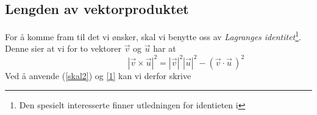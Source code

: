 \subsection*{Lengden av vektorproduktet \label{lengdvekforkl}}
For å komme fram til det vi ønsker, skal vi benytte oss av \textit{Lagranges identitet}\footnote{Den spesielt interesserte finner utledningen for identieten i }. Denne sier at vi for to vektorer
$ \vec{v} $ og $ \vec{u} $ har at
\[\phantom{testingcloservl} |\vec{v}\times\vec{u}|^2=|\vec{v}|^2|\vec{u}|^2-(\vec{v}\cdot\vec{u}\,)^2 \tag{Lagranges identitet}\]
Ved å anvende (\ref{skal2}) og \eqref{1} kan vi derfor skrive
\begin{comment}
svar på gruble
	\subsection*{\boldmath $ 2\times2 $ determinanten som areal}
	{det}
	La oss ta utgangspunkt i et parallellogram utspent av to vektorer $ \vec{u}=[a, b] $ og $ \vec{v}=[c, d] $ med en vinkel $ \theta \leq 90^\circ $ mellom seg, som skissert i \fref{det}. Fra klassisk arealregning og trigonometri vet vi at arealet $ A $ av parallallogrammet er:
	\[ A = |\vec{v}||\vec{u}|\sin \theta  \]
	Ved hjelp av identieten fra ref?? kan vi omskrive dette til:
	\begin{equation}
	A = |\vec{v}||\vec{u}|\cos (90^\circ -\theta) \label{ardet}
	\end{equation}
	Vi kan altså tolke $ A $ som skalarproduktet av $ \vec{u} $ og en vektor $ \vec{w} $ med samme lengde som $ \vec{v} $, men en retning slik at $ \angle(\vec{u}, \vec{w})=(90^\circ-\theta) $. Dette medfører at $\angle (\vec{v},\vec{w} )=90^\circ $, og da blir $ \vec{w}\cdot\vec{v}=0 $. Derfor må vi ha at:
	\[ \vec{w}=[-d, c] \quad\vee\quad \vec{w}=[d, -c] \] 
	Bare én av disse gir oss den ønskede retningen som fører oss tilbake til (\ref{ardet}), men vi merker oss følgende:
	\[\cos \angle(\vec{u}, \vec{w}) = \frac{bc-ad}{|\vec{u}||\vec{w}|} \quad \vee \quad \cos \angle(\vec{u}, \vec{w}) = -\frac{bc-ad}{|\vec{u}||\vec{w}|}\]
	De to mulige cosinusverdiene har altså eksakt samme tallverdi. Tar vi nå absoluttverdien av $ \vec{u}\cdot\vec{w} $, kan vi derfor være sikre på at vi har det samme uttrykket som i (\ref{ardet}):
	\alg{
	A &= |\vec{v}||\vec{u}|\cos (90^\circ -\theta)\\
	&= |\vec{u}\cdot\vec{w}| \\
	&= |ad-bc|}
	For $ \theta>90^\circ $ kan vi gå fram på akkurat samme måten som vi nå har gjort, og vi regner oss dermed som ferdige med forklaringen.
\end{comment}

